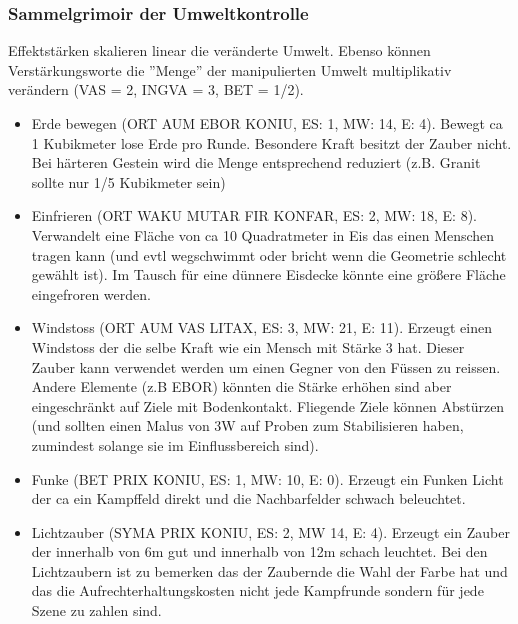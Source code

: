 \documentclass{article}
\begin{document}
\subsubsection{Sammelgrimoir der Umweltkontrolle}

Effektstärken skalieren linear die veränderte Umwelt. Ebenso können Verstärkungsworte die ''Menge'' der
manipulierten Umwelt multiplikativ verändern (VAS = 2, INGVA = 3, BET = 1/2).

\begin{itemize}
\item Erde bewegen (ORT AUM EBOR KONIU, ES: 1, MW: 14, E: 4). Bewegt ca 1 Kubikmeter lose Erde pro Runde. Besondere Kraft besitzt der Zauber nicht. Bei härteren Gestein wird die Menge entsprechend reduziert (z.B. Granit sollte nur 1/5 Kubikmeter sein)
\end{itemize}

\begin{itemize}
\item Einfrieren (ORT WAKU MUTAR FIR KONFAR, ES: 2, MW: 18, E: 8). Verwandelt eine Fläche von ca 10 Quadratmeter in Eis das einen Menschen tragen kann (und evtl wegschwimmt oder bricht wenn die Geometrie schlecht gewählt ist). Im Tausch für eine dünnere Eisdecke könnte eine größere Fläche eingefroren werden.
\end{itemize}

\begin{itemize}
\item Windstoss (ORT AUM VAS LITAX, ES: 3, MW: 21, E: 11). Erzeugt einen Windstoss der die selbe Kraft wie ein Mensch mit Stärke 3 hat. Dieser Zauber kann verwendet werden um einen Gegner von den Füssen zu reissen. Andere Elemente (z.B EBOR) könnten die Stärke erhöhen sind aber eingeschränkt auf Ziele mit Bodenkontakt. Fliegende Ziele können Abstürzen (und sollten einen Malus von 3W auf Proben zum Stabilisieren haben, zumindest solange sie im Einflussbereich sind).
\end{itemize}

\begin{itemize}
\item Funke (BET PRIX KONIU, ES: 1, MW: 10, E: 0). Erzeugt ein Funken Licht der ca ein Kampffeld direkt und die Nachbarfelder schwach beleuchtet.
\end{itemize}

\begin{itemize}
\item Lichtzauber (SYMA PRIX KONIU, ES: 2, MW 14, E: 4). Erzeugt ein Zauber der innerhalb von 6m gut und innerhalb von 12m schach leuchtet. Bei den Lichtzaubern ist zu bemerken das der Zaubernde die Wahl der Farbe hat und das die Aufrechterhaltungskosten nicht jede Kampfrunde sondern für jede Szene zu zahlen sind.
\end{itemize}
\end{document}
